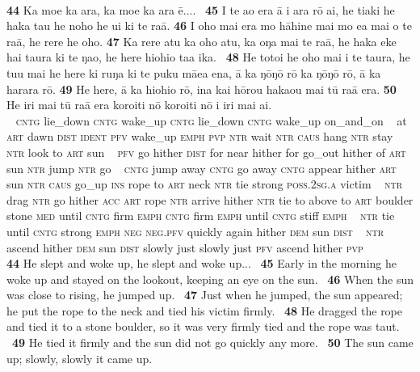 ~

\bigskip\gll
\textbf{\textup{44}} Ka moe ka {\ꞌ}ara, ka moe ka {\ꞌ}ara ē.... ~\textbf{\textup{45}} {\ꞌ}I te {\ꞌ}ao era {\ꞌ}ā i {\ꞌ}ara rō ai, he tiaki he haka tau he noho he u{\ꞌ}i ki te ra{\ꞌ}ā. \textbf{\textup{46}} I oho mai era mo hāhine mai mo e{\ꞌ}a mai o te ra{\ꞌ}ā, he rere he oho. \textbf{\textup{47}} Ka rere atu ka oho atu, ka oŋa mai te ra{\ꞌ}ā, he haka eke hai taura ki te ŋao, he here hiohio ta{\ꞌ}a ika. ~\textbf{\textup{48}} He totoi he oho mai i te taura, he tu{\ꞌ}u mai he here ki ruŋa ki te puku mā{\ꞌ}ea ena, {\ꞌ}ā ka ŋōŋō rō ka ŋōŋō rō, {\ꞌ}ā ka harara rō. \textbf{\textup{49}} He here, {\ꞌ}ā ka hiohio rō, {\ꞌ}ina kai hōrou haka{\ꞌ}ou mai tū ra{\ꞌ}ā era. \textbf{\textup{50}} He iri mai tū ra{\ꞌ}ā era koro{\ꞌ}iti nō koro{\ꞌ}iti nō i iri mai ai.\\
~ \textsc{cntg} lie\_down \textsc{cntg} wake\_up \textsc{cntg} lie\_down \textsc{cntg} wake\_up on\_and\_on ~ at \textsc{art} dawn \textsc{dist} \textsc{ident} \textsc{pfv} wake\_up \textsc{emph} \textsc{pvp} \textsc{ntr} wait \textsc{ntr} \textsc{caus} hang \textsc{ntr} stay \textsc{ntr} look to \textsc{art} sun  ~ \textsc{pfv} go hither \textsc{dist} for near hither for go\_out hither of \textsc{art} sun \textsc{ntr} jump \textsc{ntr} go  ~ \textsc{cntg} jump away \textsc{cntg} go away \textsc{cntg} appear hither \textsc{art} sun \textsc{ntr} \textsc{caus} go\_up \textsc{ins} rope to \textsc{art} neck \textsc{ntr} tie strong \textsc{poss.2sg.a} victim ~ \textsc{ntr} drag \textsc{ntr} go hither \textsc{acc} \textsc{art} rope \textsc{ntr} arrive hither \textsc{ntr} tie to above to \textsc{art} boulder stone \textsc{med} until \textsc{cntg} firm \textsc{emph} \textsc{cntg} firm \textsc{emph} until \textsc{cntg} stiff \textsc{emph} ~ \textsc{ntr} tie until \textsc{cntg} strong \textsc{emph} \textsc{neg} \textsc{neg.pfv} quickly again hither \textsc{dem} sun \textsc{dist}  ~ \textsc{ntr} ascend hither \textsc{dem} sun \textsc{dist} slowly just slowly just \textsc{pfv} ascend hither \textsc{pvp}\\

\medskip\glt
\textbf{\textup{44}} He slept and woke up, he slept and woke up... ~\textbf{\textup{45}} Early in the morning he woke up and stayed on the lookout, keeping an eye on the sun. ~\textbf{\textup{46}} When the sun was close to rising, he jumped up. ~\textbf{\textup{47}} Just when he jumped, the sun appeared; he put the rope to the neck and tied his victim firmly. ~\textbf{\textup{48}} He dragged the rope and tied it to a stone boulder, so it was very firmly tied and the rope was taut. ~\textbf{\textup{49}} He tied it firmly and the sun did not go quickly any more. ~\textbf{\textup{50}} The sun came up; slowly, slowly it came up.


